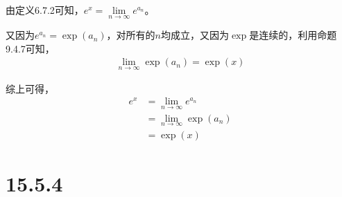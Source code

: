 \documentclass{article}
\begin{document}
\begin{itemize}
        由定义6.7.2可知，$e^x = \lim\limits_{n \to \infty} e^{a_n}$。

        又因为$e^{a_n} = \exp(a_n)$，对所有的$n$均成立，又因为$\exp$是连续的，利用命题9.4.7可知，
        \begin{align*}
          \lim\limits_{n \to \infty} \exp(a_n) = \exp(x)
        \end{align*}

        综上可得，
        \begin{align*}
          e^x & = \lim\limits_{n \to \infty} e^{a_n}   \\
              & = \lim\limits_{n \to \infty} \exp(a_n) \\
              & = \exp(x)
        \end{align*}
\end{itemize}

\section*{15.5.4}
\end{document}

